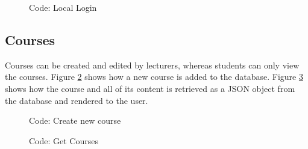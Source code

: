 \documentclass[a4paper,12pt]{article}
\numberwithin{equation}{section} %
\numberwithin{figure}{section}
\begin{document}
\begin{figure}[H]
\centering
{}
\caption{Code: Local Login}
\label{cLocallogin}
\end{figure}

\subsection{Courses}
Courses can be created and edited by lecturers, whereas students can only view the courses. Figure \ref{cPostcourse} shows how a new course is added to the database. Figure \ref{ccourses} shows how the course and all of its content is retrieved as a JSON object from the database and rendered to the user.

\begin{figure}[H]
\centering
{}
\caption{Code: Create new course}
\label{cPostcourse}
\end{figure}

\begin{figure}[H]
\centering
{}
\caption{Code: Get Courses}
\label{ccourses}
\end{figure}
\end{document}
